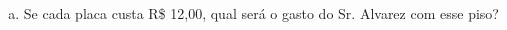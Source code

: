 \documentclass[a4paper,14pt]{article}
\begin{document}
\begin{multicols}{2}
\begin{enumerate}
\begin{enumerate}[a)]
				\item Se cada placa custa R\$ 12,00, qual será o gasto do Sr. Alvarez com esse piso? \\\\\\\\\\\\
			\end{enumerate}
		\end{enumerate}
		$~$ \\ $~$ \\ $~$ \\ 
	\end{multicols}
\end{document}
